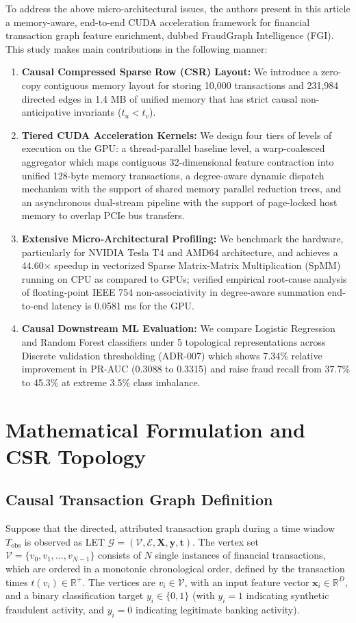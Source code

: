 \documentclass[journal]{IEEEtran}
\begin{document}
To address the above micro-architectural issues, the authors present in this article a memory-aware, end-to-end CUDA acceleration framework for financial transaction graph feature enrichment, dubbed FraudGraph Intelligence (FGI). This study makes main contributions in the following manner:
\begin{enumerate}
    \item \textbf{Causal Compressed Sparse Row (CSR) Layout:} We introduce a zero-copy contiguous memory layout for storing 10,000 transactions and 231,984 directed edges in 1.4 MB of unified memory that has strict causal non-anticipative invariants ($t_u < t_v$).
    \item \textbf{Tiered CUDA Acceleration Kernels:} We design four tiers of levels of execution on the GPU: a thread-parallel baseline level, a warp-coalesced aggregator which maps contiguous 32-dimensional feature contraction into unified 128-byte memory transactions, a degree-aware dynamic dispatch mechanism with the support of shared memory parallel reduction trees, and an asynchronous dual-stream pipeline with the support of page-locked host memory to overlap PCIe bus transfers.
    \item \textbf{Extensive Micro-Architectural Profiling:} We benchmark the hardware, particularly for NVIDIA Tesla T4 and AMD64 architecture, and achieves a 44.60$\times$ speedup in vectorized Sparse Matrix-Matrix Multiplication (SpMM) running on CPU as compared to GPUs; verified empirical root-cause analysis of floating-point IEEE 754 non-associativity in degree-aware summation end-to-end latency is 0.0581 ms for the GPU.
    \item \textbf{Causal Downstream ML Evaluation:} We compare Logistic Regression and Random Forest classifiers under 5 topological representations across Discrete validation thresholding (ADR-007) which shows 7.34\% relative improvement in PR-AUC (0.3088 to 0.3315) and raise fraud recall from 37.7\% to 45.3\% at extreme 3.5\% class imbalance.
\end{enumerate}

\section{Mathematical Formulation and CSR Topology}

\subsection{Causal Transaction Graph Definition}
Suppose that the directed, attributed transaction graph during a time window $T_{\text{obs}}$ is observed as LET $\mathcal{G} = (\mathcal{V}, \mathcal{E}, \mathbf{X}, \mathbf{y}, \mathbf{t})$. The vertex set $\mathcal{V} = \{v_0, v_1, \dots, v_{N-1}\}$ consists of $N$ single instances of financial transactions, which are ordered in a monotonic chronological order, defined by the transaction times $t(v_i) \in \mathbb{R}^+$. The vertices are $v_i \in \mathcal{V}$, with an input feature vector $\mathbf{x}_i \in \mathbb{R}^D$, and a binary classification target $y_i \in \{0, 1\}$ (with $y_i = 1$ indicating synthetic fraudulent activity, and $y_i = 0$ indicating legitimate banking activity).
\end{document}
